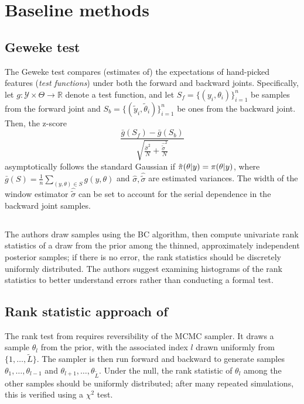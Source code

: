 \appendix

\section{Baseline methods}
\subsection{Geweke test}
The Geweke test \citep{geweke_getting_2004} compares (estimates of) the expectations of hand-picked features (\emph{test functions}) under both the forward and backward joints. 
Specifically, let $g: \mathcal{Y}\times \Theta\to \mathbb{R}$ denote a test function, and let  $S_f=\{(y_i, \theta_i)\}_{i=1}^n$ be samples from the forward joint and $S_b=\{(\tilde{y}_i, \tilde{\theta}_i)\}_{i=1}^n$ be ones from the backward joint.
Then, the z-score 
\begin{equation}
    \frac{\bar{g}(S_f) - \bar{g}(S_b)}{\sqrt{ \frac{\hat{\sigma}^{2}}{N} + \frac{\hat{\tilde{\sigma}}^{2}}{N}}} 
    \label{eq:geweke}
\end{equation}
asymptotically follows the standard Gaussian if $\tilde{\pi}(\theta\vert y)=\pi(\theta\vert y)$, where $\bar{g}(S) = \frac{1}{n}\sum_{(y,\theta) \in S}g(y, \theta)$ and $\hat{\sigma}, \hat{\tilde{\sigma}}$ are estimated variances. 
The width of the window estimator $\hat{\tilde{\sigma}}$ can be set to account for the serial dependence in the backward joint samples.
\subsection{\cite{talts_validating_2018}}
The authors draw samples using the BC algorithm, then compute univariate rank statistics of a draw from the prior among the thinned, approximately independent posterior samples; if there is no error, the rank statistics should be discretely uniformly distributed. 
The authors suggest examining histograms of the rank statistics to better understand errors rather than conducting a formal test.

\subsection{Rank statistic approach of \cite{gandy_unit_2020}}
The rank test from \cite{gandy_unit_2020} requires reversibility of the MCMC sampler. It draws a sample $\theta_{l}$ from the prior, with the associated index $l$ drawn uniformly from $\{1,\ldots,\tilde{L}\}$. The sampler is then run forward and backward to generate samples $\theta_{1}, \ldots, \theta_{l-1}$ and $\theta_{l+1}, \ldots, \theta_{\tilde{L}} $. Under the null, the rank statistic of $\theta_{l}$ among the other samples should be uniformly distributed; after many repeated simulations, this is verified using a $\chi^{2}$ test.

